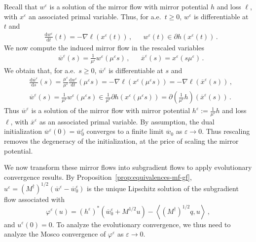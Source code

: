 \documentclass[11pt,english,reqno]{article}
\newcommand{\diff}{\mathrm{d}}
\renewcommand{\geq}{\geqslant}
\theoremstyle{plain}
\theoremstyle{definition}
\theoremstyle{remark}
\numberwithin{equation}{section}
\begin{document}
Recall that $w^\varepsilon$ is a solution of the mirror flow with mirror potential $h$ and loss $\ell$, with $x^\varepsilon$ an associated primal variable. Thus, for a.e.~$t \geq 0$, $w^\varepsilon$ is differentiable at $t$ and
\begin{align*}
	&\frac{\diff w^\varepsilon}{\diff t}(t) = - \nabla \ell(x^\varepsilon(t)) \, , &&w^\varepsilon(t) \in \partial h(x^\varepsilon(t)) \, .
\end{align*}
We now compute the induced mirror flow in the rescaled variables 
\begin{align*}
	&\overline{w}^\varepsilon(s) = \frac{1}{\mu^\varepsilon} w^\varepsilon(\mu^\varepsilon s)  \, , &&\overline{x}^\varepsilon(s) = x^\varepsilon(s \mu^\varepsilon) \, .
\end{align*}
We obtain that, for a.e.~$s \geq 0$, $\overline{w}^\varepsilon$ is differentiable at $s$ and
\begin{align}
	&\frac{\diff \overline{w}^\varepsilon}{\diff s}(s) = \frac{\mu^\varepsilon}{\mu^\varepsilon} \frac{\diff w^\varepsilon}{\diff t}(\mu^\varepsilon s) = - \nabla \ell({x}^\varepsilon(\mu^\varepsilon s)) = -\nabla \ell(\overline{x}^\varepsilon(s)) \, , \nonumber \\
	&\overline{w}^\varepsilon(s) = \frac{1}{\mu^\varepsilon} w^\varepsilon(\mu^\varepsilon s) \in \frac{1}{\mu^\varepsilon} \partial h(x^\varepsilon(\mu^\varepsilon s))  = \partial \left( \frac{1}{\mu^\varepsilon} h \right) (\overline{x}^\varepsilon(s)) \, . \label{eq:aux-4}
\end{align}
Thus $\overline{w}^\varepsilon$ is a solution of the mirror flow with mirror potential $h^\varepsilon := \frac{1}{\mu^\varepsilon} h$ and loss $\ell$, with $\overline{x}^\varepsilon$ as an associated primal variable. By assumption, the dual initialization $\overline{w}^\varepsilon(0) = \overline{w}_0^\varepsilon$ converges to a finite limit $\overline{w}_0$ as $\varepsilon \to 0$. Thus rescaling removes the degeneracy of the initialization, at the price of scaling the mirror potential.

We now transform these mirror flows into subgradient flows to apply evolutionary convergence results. By Proposition~\ref{prop:equivalences-mf-gf}, $u^\varepsilon = (M^\dagger)^{1/2} (\overline{w}^\varepsilon - \overline{w}_0^\varepsilon)$ is the unique Lipschitz solution of the subgradient flow associated with
\begin{equation*}
	\varphi^\varepsilon(u) = \left(h^\varepsilon\right)^*(\overline{w}_0^\varepsilon + M^{1/2} u) - \left\langle (M^\dagger)^{1/2} q ,  u \right\rangle \, ,
\end{equation*}
and $u^\varepsilon(0) = 0$. To analyze the evolutionary convergence, we thus need to analyze the Mosco convergence of $\varphi^\varepsilon$ as $\varepsilon \to 0$. 
\end{document}
